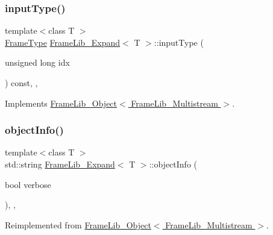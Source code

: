\subsubsection{\texorpdfstring{input\+Type()}{inputType()}}
{\footnotesize\ttfamily template$<$class T $>$ \\
\hyperlink{_frame_lib___types_8h_ad495a9f61af7fff07d7e97979d1ab854}{Frame\+Type} \hyperlink{class_frame_lib___expand}{Frame\+Lib\+\_\+\+Expand}$<$ T $>$\+::input\+Type (\begin{DoxyParamCaption}\item[{unsigned long}]{idx }\end{DoxyParamCaption}) const\hspace{0.3cm}{\ttfamily [inline]}, {\ttfamily [override]}, {\ttfamily [virtual]}}



Implements \hyperlink{class_frame_lib___object_ab1ab1ae8180bb8b7e881aac6a4e1066c}{Frame\+Lib\+\_\+\+Object$<$ Frame\+Lib\+\_\+\+Multistream $>$}.

\mbox{\label{class_frame_lib___expand_ae3cdc7661ba6a00f816e9aaea68ce262}} 
\subsubsection{\texorpdfstring{object\+Info()}{objectInfo()}}
{\footnotesize\ttfamily template$<$class T $>$ \\
std\+::string \hyperlink{class_frame_lib___expand}{Frame\+Lib\+\_\+\+Expand}$<$ T $>$\+::object\+Info (\begin{DoxyParamCaption}\item[{bool}]{verbose }\end{DoxyParamCaption})\hspace{0.3cm}{\ttfamily [inline]}, {\ttfamily [override]}, {\ttfamily [virtual]}}



Reimplemented from \hyperlink{class_frame_lib___object_a10d673de9a3c59ace6a22ba1cff313c8}{Frame\+Lib\+\_\+\+Object$<$ Frame\+Lib\+\_\+\+Multistream $>$}.

\mbox{\label{class_frame_lib___expand_a0c7a6f0cc3779c6fb6a61fe8e3a8bc60}} 
